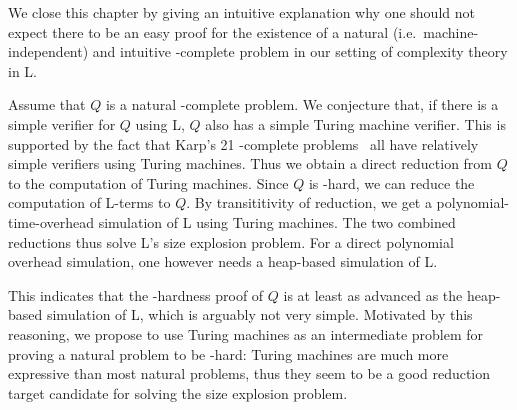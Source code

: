 \begin{remark}\label{rem:cook_L}
We close this chapter by giving an intuitive explanation why one should not expect there to be an easy proof for the existence of a natural (i.e.\ machine-independent) and intuitive \NP{}-complete problem in our setting of complexity theory in L.

Assume that $Q$ is a natural \NP{}-complete problem. We conjecture that, if there is a simple verifier for $Q$ using L, $Q$ also has a simple Turing machine verifier. This is supported by the fact that Karp's 21 \NP{}-complete problems~\cite{Karp1972} all have relatively simple verifiers using Turing machines.
Thus we obtain a direct reduction from $Q$ to the computation of Turing machines. 
Since $Q$ is \NP{}-hard, we can reduce the computation of L-terms to $Q$. By transititivity of reduction, we get a polynomial-time-overhead simulation of L using Turing machines. The two combined reductions thus solve L's size explosion problem. 
For a direct polynomial overhead simulation, one however needs a heap-based simulation of L.

This indicates that the \NP{}-hardness proof of $Q$ is at least as advanced as the heap-based simulation of L, which is arguably not very simple.
Motivated by this reasoning, we propose to use Turing machines as an intermediate problem for proving a natural problem to be \NP{}-hard: Turing machines are much more expressive than most natural problems, thus they seem to be a good reduction target candidate for solving the size explosion problem.
\end{remark}
